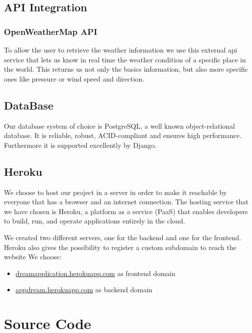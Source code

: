 \documentclass[table, 12pt]{article}
\begin{document}
\subsection{API Integration}
\subsubsection{OpenWeatherMap API}
To allow the user to retrieve the weather information we use this external api service that lets us know in real time
the weather condition of a specific place in the world.
This returns us not only the basics information, but also more specific ones like pressure or wind speed and direction.

\subsection{DataBase}
Our database system of choice is PostgreSQL, a well known object-relational database. It is reliable, robust, ACID-compliant and ensures high performance. 
Furthermore it is supported excellently by Django.

\subsection{Heroku}
We choose to host our project in a server in order to make it reachable by everyone
that has a browser and an internet connection.
The hosting service that we have chosen is Heroku, a platform as a service (PaaS)
that enables developers to build, run, and operate applications entirely
in the cloud.

We created two different servers, one for the backend and one for the frontend.
Heroku also gives the possibility to register a custom subdomain to reach the
website
We choose:
\begin{itemize}
    \item \url{dreamapplication.herokuapp.com} as frontend domain
    \item \url{appdream.herokuapp.com} as backend domain
\end{itemize}



\section{Source Code}
\end{document}
